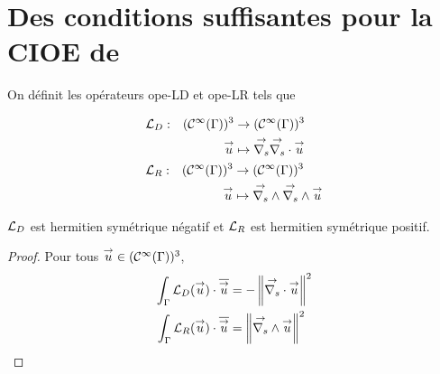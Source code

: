 \section[Des CSU pour la CIOE de Marceaux 2000]{Des conditions suffisantes pour la CIOE de \cite{marceaux_high-order_2000}}

  \begin{defn}
    On définit les opérateurs \gls{ope-LD} et \gls{ope-LR} tels que %

    \begin{equation*}
      \begin{aligned}
        &\fonction{\LD}{(\mathcal{C}^\infty(\Gamma))^3}{(\mathcal{C}^\infty(\Gamma))^3}%
          {\vu}{\vgrads{\vdivs \vu}}
        \\
        &\fonction{\LR}{(\mathcal{C}^\infty(\Gamma))^3}{(\mathcal{C}^\infty(\Gamma))^3}%
          {\vu}{\vrots{\vrots \vu}}
      \end{aligned}
    \end{equation*}
  \end{defn}

  \begin{prop}
    \({\mathcal{L}_D}\) est hermitien symétrique négatif et \({\mathcal{L}_R}\) est hermitien symétrique positif.
  \end{prop}

  \begin{proof}
    Pour tous \({\overset{\rightarrow}{u}} \in (\mathcal C^\infty(\Gamma))^3\),
    \begin{align*}
      \int_\Gamma {\mathcal{L}_D}({\overset{\rightarrow}{u}})\cdot {\overline{{\overset{\rightarrow}{u}}}} &= -\left\lVert{\overset{\rightarrow}{\nabla_s}} \cdot {\overset{\rightarrow}{u}}\right\rVert^2
      \\
      \int_\Gamma {\mathcal{L}_R}({\overset{\rightarrow}{u}})\cdot {\overline{{\overset{\rightarrow}{u}}}} &=\left\lVert {\overset{\rightarrow}{\nabla_s}} \wedge {\overset{\rightarrow}{u}}\right\rVert^2
    \end{align*}
  \end{proof}

